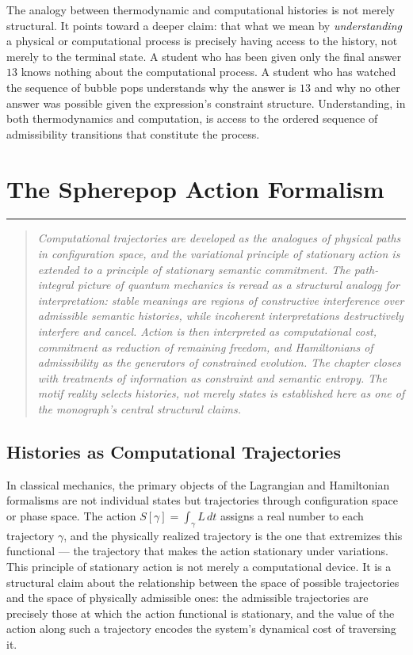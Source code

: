 \documentclass[12pt,openany]{book}
\theoremstyle{plain}
\theoremstyle{definition}
\theoremstyle{remark}
\newcommand{\chapterrule}{%
  \vspace{4pt}%
  {\color{SpherepopBlue}\rule{\textwidth}{0.8pt}}%
  \vspace{10pt}%
}
\newenvironment{chapterprecis}{%
  \begin{quote}\small\itshape}{%
  \end{quote}\medskip}
\begin{document}
The analogy between thermodynamic and computational histories is not merely structural. It points toward a deeper claim: that what we mean by \emph{understanding} a physical or computational process is precisely having access to the history, not merely to the terminal state. A student who has been given only the final answer $13$ knows nothing about the computational process. A student who has watched the sequence of bubble pops understands why the answer is $13$ and why no other answer was possible given the expression's constraint structure. Understanding, in both thermodynamics and computation, is access to the ordered sequence of admissibility transitions that constitute the process.

\chapter{The Spherepop Action Formalism}
\chapterrule

\begin{chapterprecis}
Computational trajectories are developed as the analogues of
physical paths in configuration space, and the variational
principle of stationary action is extended to a principle of
stationary semantic commitment. The path-integral picture of
quantum mechanics is reread as a structural analogy for
interpretation: stable meanings are regions of constructive
interference over admissible semantic histories, while incoherent
interpretations destructively interfere and cancel. Action is
then interpreted as computational cost, commitment as reduction
of remaining freedom, and Hamiltonians of admissibility as the
generators of constrained evolution. The chapter closes with
treatments of information as constraint and semantic entropy.
The motif \emph{reality selects histories, not merely states}
is established here as one of the monograph's central structural
claims.
\end{chapterprecis}

\section{Histories as Computational Trajectories}

In classical mechanics, the primary objects of the Lagrangian and Hamiltonian formalisms are not individual states but trajectories through configuration space or phase space. The action $S[\gamma] = \int_\gamma L\, dt$ assigns a real number to each trajectory $\gamma$, and the physically realized trajectory is the one that extremizes this functional — the trajectory that makes the action stationary under variations. This principle of stationary action is not merely a computational device. It is a structural claim about the relationship between the space of possible trajectories and the space of physically admissible ones: the admissible trajectories are precisely those at which the action functional is stationary, and the value of the action along such a trajectory encodes the system's dynamical cost of traversing it.
\end{document}
